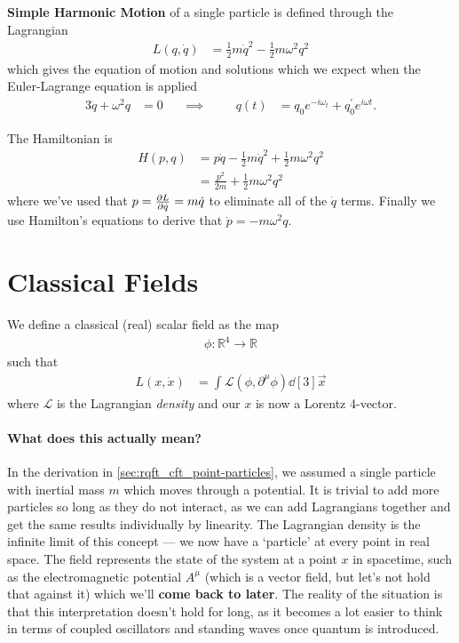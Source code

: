 \documentclass[notes.tex]{subfiles}
\begin{document}
\begin{example}
  \textbf{Simple Harmonic Motion} of a single particle is defined through the Lagrangian
  \begin{align*}
    L(q, \dot{q}) &= \frac{1}{2} m \dot{q}^2 - \frac{1}{2} m \omega^2 q^2
  \end{align*}
  which gives the equation of motion and solutions which we expect when the Euler-Lagrange equation is applied
  \begin{alignat*}{3}
    \ddot{q} + \omega^2 q &= 0 & \quad\implies &\quad& q(t) &= q_0 e^{-i\omega_t} + q_0^\prime e^{i\omega t}.
  \end{alignat*}
  
  The Hamiltonian is
  \begin{align*}
    H(p, q) &= p \dot{q} - \frac{1}{2} m \dot{q}^2 + \frac{1}{2} m \omega^2 q^2\\
    &= \frac{p^2}{2m} + \frac{1}{2} m \omega^2 q^2
  \end{align*}
  where we've used that $p = \pdv{L}{\dot{q}} = m \dot{q}$ to eliminate all of the $\dot{q}$ terms.
  Finally we use Hamilton's equations to derive that $\dot{p} = -m\omega^2 q$. 
\end{example}

\section{Classical Fields}
We define a classical (real) scalar field as the map
\begin{align*}
  \phi : \mathbb{R}^4 \to \mathbb{R}
\end{align*}
such that
\begin{align*}
  L(x, \dot{x}) &= \int \mathcal{L}(\phi, \partial^\mu \phi) \dd[3]{\vec{x}}
\end{align*}
where $\mathcal{L}$ is the Lagrangian \emph{density} and our $x$ is now a Lorentz 4-vector. 

\paragraph{What does this actually mean?} In the derivation in \autoref{sec:rqft_cft_point-particles}, we assumed a single particle with inertial mass $m$ which moves through a potential. It is trivial to add more particles so long as they do not interact, as we can add Lagrangians together and get the same results individually by linearity. The Lagrangian density is the infinite limit of this concept --- we now have a `particle' at every point in real space. The field represents the state of the system at a point $x$ in spacetime, such as the electromagnetic potential $A^\mu$ (which is a vector field, but let's not hold that against it) which we'll \textbf{come back to later}. The reality of the situation is that this interpretation doesn't hold for long, as it becomes a lot easier to think in terms of coupled oscillators and standing waves once quantum is introduced.
\end{document}
